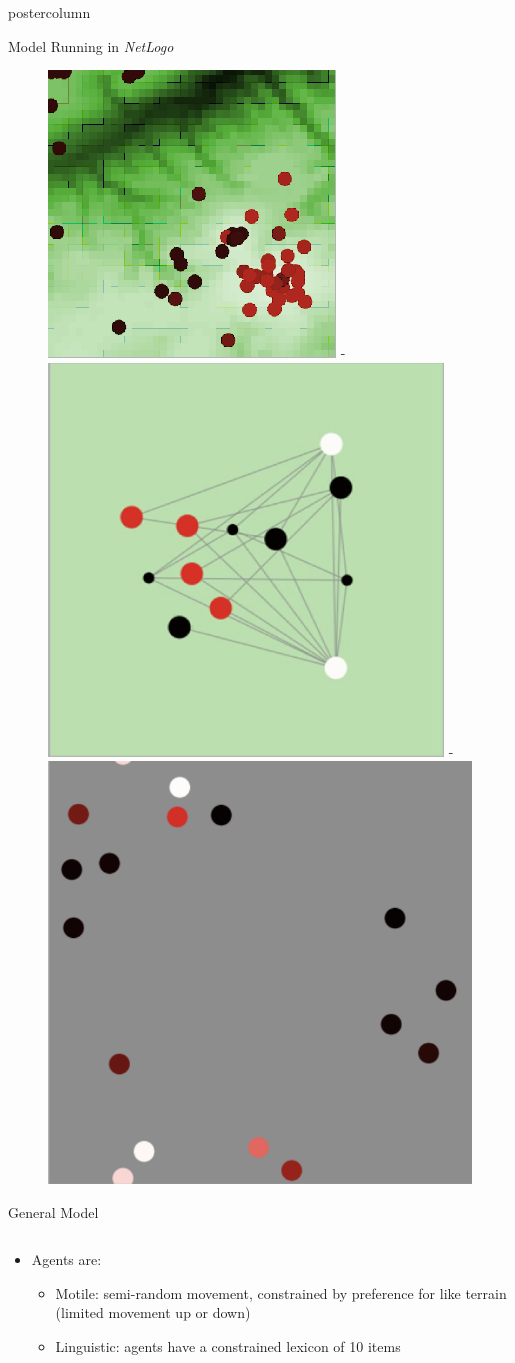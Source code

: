 \documentclass[final,hyperref={pdfpagelabels=false}]{beamer}
\begin{document}
\begin{frame}
\begin{columns}
\begin{column}{.33\textwidth}
\begin{beamercolorbox}[center,wd=\textwidth]{postercolumn}
\begin{minipage}[T]{.95\textwidth}
{\begin{block}{Model Running in \textit{NetLogo}}
              \begin{figure}
                \centering
                \includegraphics[width=0.32\linewidth]{images/netlogo}
                -
                \includegraphics[width=0.32\linewidth]{images/networks}
                -
                \includegraphics[width=0.32\linewidth]{images/random_movement}
              \end{figure}
            \end{block}
            \vfill
            \begin{block}{General Model}
              \begin{columns}
                \begin{column}{.99\textwidth}
                  \begin{itemize}
                    \item Agents are:
                      \begin{itemize}
                        \item Motile: semi-random movement, constrained by preference for like terrain (limited movement up or down)
                        \item Linguistic: agents have a constrained lexicon of 10 items

\end{itemize}
\end{itemize}
\end{column}
\end{columns}
\end{block}}
\end{minipage}
\end{beamercolorbox}
\end{column}
\end{columns}
\end{frame}
\end{document}
